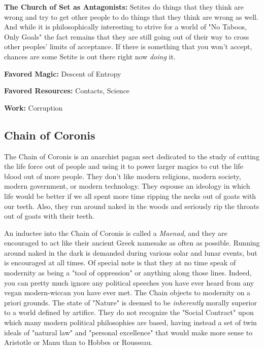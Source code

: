 \textbf{The Church of Set as Antagonists:} Setites do things that they think are wrong and try to get other people to do things that they think are wrong as well. And while it is philosophically interesting to strive for a world of "No Taboos, Only Goals" the fact remains that they are still going out of their way to cross other peoples' limits of acceptance. If there is something that you won't accept, chances are some Setite is out there right now \textit{doing} it.

\textbf{Favored Magic:}  Descent of Entropy

\textbf{Favored Resources:} Contacts, Science

\textbf{Work:} Corruption

\subsection{Chain of Coronis} 

The Chain of Coronis is an anarchist pagan sect dedicated to the study of cutting the life force out of people and using it to power larger magics to cut the life blood out of more people. They don't like modern religions, modern society, modern government, or modern technology. They espouse an ideology in which life would be better if we all spent more time ripping the necks out of goats with our teeth. Also, they run around naked in the woods and seriously rip the throats out of goats with their teeth.

An inductee into the Chain of Coronis is called a \textit{Maenad}, and they are encouraged to act like their ancient Greek namesake as often as possible. Running around naked in the dark is demanded during various solar and lunar events, but is encouraged at all times. Of special note is that they at no time speak of modernity as being a "tool of oppression" or anything along those lines. Indeed, you can pretty much ignore any political speeches you have ever heard from any vegan modern-wiccan you have ever met. The Chain objects to modernity on a priori grounds. The state of "Nature" is deemed to be \textit{inherently} morally superior to a world defined by artifice. They do not recognize the "Social Contract" upon which many modern political philosophies are based, having instead a set of twin ideals of "natural law" and "personal excellence" that would make more sense to Aristotle or Manu than to Hobbes or Rousseau.

